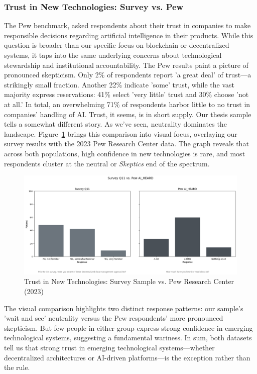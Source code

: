 	\subsubsection{Trust in New Technologies: Survey vs. Pew}
	The Pew benchmark, asked respondents about their trust in companies to make responsible decisions regarding artificial intelligence in their products. While this question is broader than our specific focus on blockchain or decentralized systems, it taps into the same underlying concerns about technological stewardship and institutional accountability. The Pew results paint a picture of pronounced skepticism. Only 2\% of respondents report 'a great deal' of trust—a strikingly small fraction. Another 22\% indicate 'some' trust, while the vast majority express reservations: 41\% select 'very little' trust and 30\% choose 'not at all.' In total, an overwhelming 71\% of respondents harbor little to no trust in companies' handling of AI. Trust, it seems, is in short supply.
	Our thesis sample tells a somewhat different story. As we've seen, neutrality dominates the landscape.
	Figure~\ref{fig:trust_newtech_Pew} brings this comparison into visual focus, overlaying our survey results with the 2023 Pew Research Center data. The graph reveals that across both populations, high confidence in new technologies is rare, and most respondents cluster at the neutral or \textit{Skeptics} end of the spectrum.
	\begin{figure}[ht]\centering
		\includegraphics[width=1\linewidth]{figures/img/Pew_comparison_plots/compare_11_vs_AI_HEARD.png}
		\caption{Trust in New Technologies: Survey Sample vs. Pew Research Center (2023)}
		\label{fig:trust_newtech_Pew}
	\end{figure}
	The visual comparison highlights two distinct response patterns: our sample's 'wait and see' neutrality versus the Pew respondents' more pronounced skepticism. But few people in either group express strong confidence in emerging technological systems, suggesting a fundamental wariness. 			
	In sum, both datasets tell us that strong trust in emerging technological systems—whether decentralized architectures or AI-driven platforms—is the exception rather than the rule.
